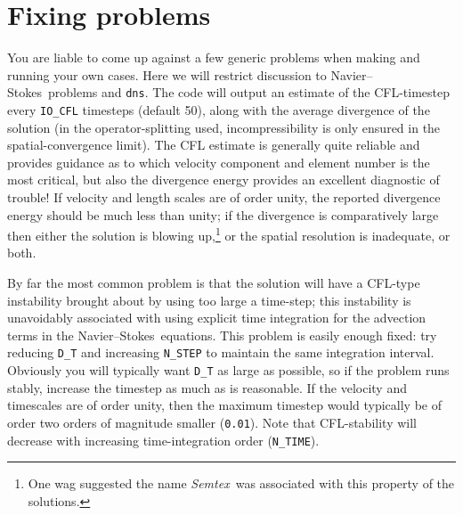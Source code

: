 \documentclass[11pt]{report}
\newcommand{\Semtex}{\emph{Semtex}} \newcommand{\Dog}{\emph{Dog}}
\newcommand\NavSto{Navier--Stokes}
\begin{document}
\section{Fixing problems}
\label{sec.fix}

You are liable to come up against a few generic problems when making
and running your own cases. Here we will restrict discussion to
\NavSto\ problems and \verb+dns+.  The code will output an estimate of
the CFL-timestep every \verb+IO_CFL+ timesteps (default 50), along
with the average divergence of the solution (in the operator-splitting
used, incompressibility is only ensured in the spatial-convergence
limit).
%
The CFL estimate is generally quite reliable and provides guidance as
to which velocity component and element number is the most critical,
but also the divergence energy provides an excellent diagnostic of
trouble!
%
If velocity and length scales are of order unity, the reported
divergence energy should be much less than unity; if the divergence is
comparatively large then either the solution is blowing
up,\footnote{One wag suggested the name \Semtex\ was associated with
  this property of the solutions.} or the spatial resolution is
inadequate, or both.

By far the most common problem is that the solution will have a
CFL-type instability brought about by using too large a time-step;
this instability is unavoidably associated with using explicit time
integration for the advection terms in the \NavSto\ equations. This
problem is easily enough fixed: try reducing \verb+D_T+ and increasing
\verb+N_STEP+ to maintain the same integration interval. Obviously you
will typically want \verb+D_T+ as large as possible, so if the problem
runs stably, increase the timestep as much as is reasonable. If the
velocity and timescales are of order unity, then the maximum timestep
would typically be of order two orders of magnitude smaller
(\verb+0.01+). Note that CFL-stability will decrease with increasing
time-integration order (\verb+N_TIME+).
\end{document}
